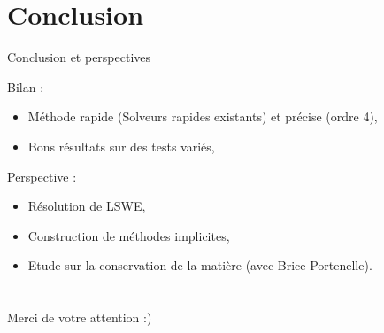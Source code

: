 \documentclass[11pt]{beamer}
\begin{document}
\section{Conclusion}
\begin{frame}{Conclusion et perspectives}
\begin{block}{Bilan :}
\begin{itemize}
\item Méthode rapide (Solveurs rapides existants) et précise (ordre 4),\\
\item Bons résultats sur des tests variés,\\
\end{itemize}
\end{block}

\begin{block}{Perspective :}
\begin{itemize}
\item Résolution de LSWE,\\
\item Construction de méthodes implicites,\\
\item Etude sur la conservation de la matière (avec Brice Portenelle).
\end{itemize}
\end{block}


\end{frame}




\section*{}
\begin{frame}
\begin{center}
Merci de votre attention :)
\end{center}
\end{frame}
\end{document}
